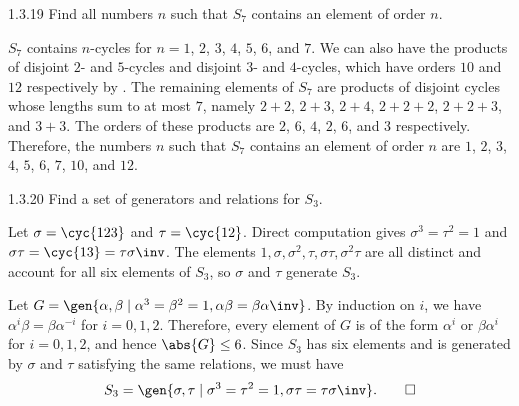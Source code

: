 \begin{exercise}{1.3.19}
    Find all numbers $n$ such that $S_7$ contains an element of order $n$.
\end{exercise}

\begin{sol}
    $S_7$ contains $n$-cycles for $n = 1$, $2$, $3$, $4$, $5$, $6$, and $7$.
    We can also have the products of disjoint $2$- and $5$-cycles and disjoint $3$- and $4$-cycles, which have orders $10$ and $12$ respectively by .
    The remaining elements of $S_7$ are products of disjoint cycles whose lengths sum to at most $7$, namely $2+2$, $2+3$, $2+4$, $2+2+2$, $2+2+3$, and $3+3$. 
    The orders of these products are $2$, $6$, $4$, $2$, $6$, and $3$ respectively. 
    Therefore, the numbers $n$ such that $S_7$ contains an element of order $n$ are $1$, $2$, $3$, $4$, $5$, $6$, $7$, $10$, and $12$.
\end{sol}

\begin{exercise}{1.3.20}
    Find a set of generators and relations for $S_3$.
\end{exercise}

\begin{sol}
    Let $\sigma = \cyc{1 2 3}$ and $\tau = \cyc{1 2}$. 
    Direct computation gives $\sigma^3 = \tau^2 = 1$ and $\sigma\tau = \cyc{1 3} = \tau\sigma\inv$.
    The elements $1, \sigma, \sigma^2, \tau, \sigma\tau, \sigma^2\tau$ are all distinct and account for all six elements of $S_3$, so $\sigma$ and $\tau$ generate $S_3$.
    
    Let $G = \gen{\alpha, \beta \mid \alpha^3 = \beta^2 = 1, \alpha\beta = \beta\alpha\inv}$.
    By induction on $i$, we have $\alpha^i \beta = \beta \alpha^{-i}$ for $i = 0, 1, 2$.
    Therefore, every element of $G$ is of the form $\alpha^i$ or $\beta \alpha^i$ for $i = 0, 1, 2$, and hence $\abs{G} \leq 6$.
    Since $S_3$ has six elements and is generated by $\sigma$ and $\tau$ satisfying the same relations, we must have
    \[
        S_3 = \gen{\sigma, \tau \mid \sigma^3 = \tau^2 = 1, \sigma\tau = \tau\sigma\inv}. \qedhere
    \]
\end{sol}